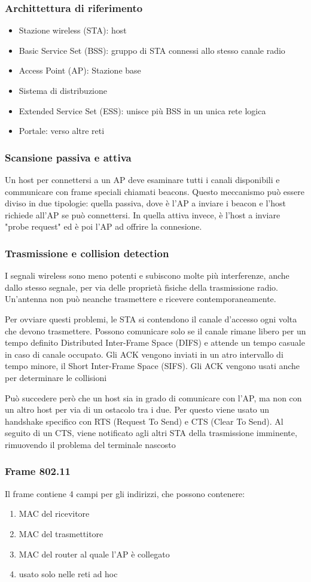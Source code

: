 \documentclass[12pt, a4paper]{article}
\begin{document}
\subsubsection{Archittettura di riferimento}
\begin{itemize}
    \item Stazione wireless (STA): host
    \item Basic Service Set (BSS): gruppo di STA connessi allo stesso canale radio
    \item Access Point (AP): Stazione base
    \item Sistema di distribuzione
    \item Extended Service Set (ESS): unisce più BSS in un unica rete logica
    \item Portale: verso altre reti
\end{itemize}

\subsubsection{Scansione passiva e attiva}
Un host per connettersi a un AP deve esaminare tutti i canali disponibili e communicare con frame speciali chiamati
beacons. Questo meccanismo può essere diviso in due tipologie: quella passiva, dove è l'AP a inviare i beacon e 
l'host richiede all'AP se può connettersi. In quella attiva invece, è l'host a inviare "probe request" ed è poi 
l'AP ad offrire la connesione.

\subsubsection{Trasmissione e collision detection}
I segnali wireless sono meno potenti e subiscono molte più interferenze, anche dallo stesso segnale, per via 
delle proprietà fisiche della trasmissione radio. Un'antenna non può neanche trasmettere e ricevere 
contemporaneamente. 

Per ovviare questi problemi, le STA si contendono il canale d'accesso ogni volta che devono trasmettere. Possono 
comunicare solo se il canale rimane libero per un tempo definito Distributed Inter-Frame Space (DIFS) e attende
un tempo casuale in caso di canale occupato. Gli ACK vengono inviati in un atro intervallo di tempo minore, il
Short Inter-Frame Space (SIFS). Gli ACK vengono usati anche per determinare le collisioni

Può succedere però che un host sia in grado di comunicare con l'AP, ma non con un altro host per via di un
ostacolo tra i due. Per questo viene usato un handshake specifico con RTS (Request To Send) e CTS (Clear To 
Send). Al seguito di un CTS, viene notificato agli altri STA della trasmissione imminente, rimuovendo il 
problema del terminale nascosto

\subsubsection{Frame 802.11}
Il frame contiene 4 campi per gli indirizzi, che possono contenere:
\begin{enumerate}
    \item MAC del ricevitore
    \item MAC del trasmettitore
    \item MAC del router al quale l'AP è collegato
    \item usato solo nelle reti ad hoc
\end{enumerate}
\end{document}
